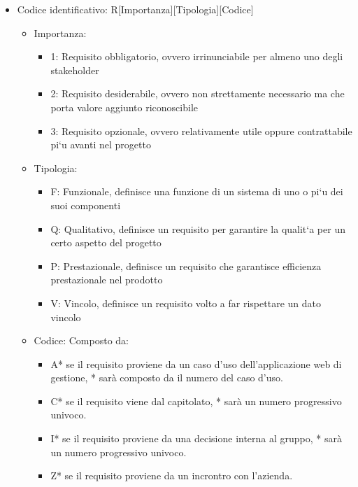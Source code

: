     \begin{itemize}
        \item Codice identificativo: R[Importanza][Tipologia][Codice]
            \begin{itemize}
                \item Importanza: 
                    \begin{itemize}
                        \item 1: Requisito obbligatorio, ovvero irrinunciabile per almeno uno degli stakeholder
                        \item 2: Requisito desiderabile, ovvero non strettamente necessario ma che porta valore aggiunto
                        riconoscibile
                        \item 3: Requisito opzionale, ovvero relativamente utile oppure contrattabile pi`u avanti nel progetto
                    \end{itemize}
                \item Tipologia:
                    \begin{itemize}
                        \item F: Funzionale, definisce una funzione di un sistema di uno o pi`u dei suoi componenti
                        \item Q: Qualitativo, definisce un requisito per garantire la qualit`a per un certo aspetto del progetto
                        \item P: Prestazionale, definisce un requisito che garantisce efficienza prestazionale nel prodotto
                        \item V: Vincolo, definisce un requisito volto a far rispettare un dato vincolo
                    \end{itemize}
                \item Codice:
                    Composto da:
                    \begin{itemize}
                        \item A* se il requisito proviene da un caso d'uso dell'applicazione web di gestione, * sarà composto da il
                        numero del caso d'uso.
                        \item C* se il requisito viene dal capitolato, * sarà un numero progressivo univoco.
                        \item I* se il requisito proviene da una decisione interna al gruppo, * sarà un numero progressivo univoco.
                        \item Z* se il requisito proviene da un incrontro con l'azienda.


\end{itemize}
\end{itemize}
\end{itemize}
